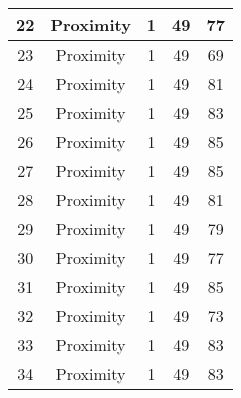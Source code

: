 \documentclass[results.tex]{subfiles}
\begin{document}
\begin{center}
\begin{tabular}{| c || c | c | c | c |}
            \hline
            22                      & Proximity                    & 1                      & 49                      & 77                   \\
            \hline
            23                      & Proximity                    & 1                      & 49                      & 69                   \\
            \hline
            24                      & Proximity                    & 1                      & 49                      & 81                   \\
            \hline
            25                      & Proximity                    & 1                      & 49                      & 83                   \\
            \hline
            26                      & Proximity                    & 1                      & 49                      & 85                   \\
            \hline
            27                      & Proximity                    & 1                      & 49                      & 85                   \\
            \hline
            28                      & Proximity                    & 1                      & 49                      & 81                   \\
            \hline
            29                      & Proximity                    & 1                      & 49                      & 79                   \\
            \hline
            30                      & Proximity                    & 1                      & 49                      & 77                   \\
            \hline
            31                      & Proximity                    & 1                      & 49                      & 85                   \\
            \hline
            32                      & Proximity                    & 1                      & 49                      & 73                   \\
            \hline
            33                      & Proximity                    & 1                      & 49                      & 83                   \\
            \hline
            34                      & Proximity                    & 1                      & 49                      & 83                   \\

\end{tabular}
\end{center}
\end{document}
